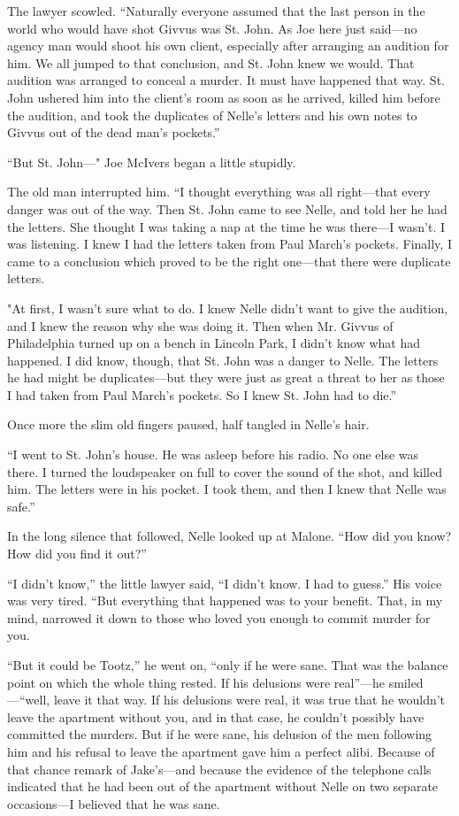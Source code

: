 \documentclass{novel}
\begin{document}
The lawyer scowled. “Naturally everyone assumed that the last person in the world who would have shot Givvus was St. John. As Joe here just said—no agency man would shoot his own client, especially after arranging an audition for him. We all jumped to that conclusion, and St. John knew we would. That audition was arranged to conceal a murder. It must have happened that way. St. John ushered him into the client’s room as soon as he arrived, killed him before the audition, and took the duplicates of Nelle’s letters and his own notes to Givvus out of the dead man’s pockets.”

“But St. John—" Joe McIvers began a little stupidly.

The old man interrupted him. “I thought everything was all right—that every danger was out of the way. Then St. John came to see Nelle, and told her he had the letters. She thought I was taking a nap at the time he was there—I wasn’t. I was listening. I knew I had the letters taken from Paul March’s pockets. Finally, I came to a conclusion which proved to be the right one—that there were duplicate letters.

"At first, I wasn’t sure what to do. I knew Nelle didn’t want to give the audition, and I knew the reason why she was doing it. Then when Mr. Givvus of Philadelphia turned up on a bench in Lincoln Park, I didn’t know what had happened. I did know, though, that St. John was a danger to Nelle. The letters he had might be duplicates—but they were just as great a threat to her as those I had taken from Paul March’s pockets. So I knew St. John had to die.”

Once more the slim old fingers paused, half tangled in Nelle’s hair.

“I went to St. John’s house. He was asleep before his radio. No one else was there. I turned the loudspeaker on full to cover the sound of the shot, and killed him. The letters were in his pocket. I took them, and then I knew that Nelle was safe.”

In the long silence that followed, Nelle looked up at Malone. “How did you know? How did you find it out?”

“I didn’t know,” the little lawyer said, “I didn’t know. I had to guess.” His voice was very tired. “But everything that happened was to your benefit. That, in my mind, narrowed it down to those who loved you enough to commit murder for you.

“But it could be Tootz,” he went on, “only if he were sane. That was the balance point on which the whole thing rested. If his delusions were real”—he smiled—“well, leave it that way. If his delusions were real, it was true that he wouldn’t leave the apartment without you, and in that case, he couldn’t possibly have committed the murders. But if he were sane, his delusion of the men following him and his refusal to leave the apartment gave him a perfect alibi. Because of that chance remark of Jake’s—and because the evidence of the telephone calls indicated that he had been out of the apartment without Nelle on two separate occasions—I believed that he was sane.
\end{document}
